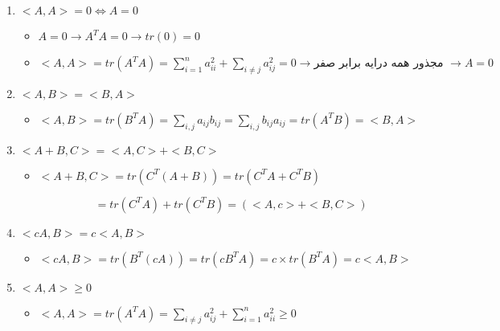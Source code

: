 \setLTR

\begin{enumerate}
	\item  $<A,A>=0 \Longleftrightarrow A=0$
	\begin{itemize}
		\item $A=0\rightarrow A^TA=0\rightarrow tr(0)=0$
		\item $<A,A>=tr(A^TA)=\sum^{n}_{i=1}a_{ii}^2 + \sum_{i\neq j}^{}a_{ij}^2=0 \rightarrow
		\text{مجذور همه درایه‌ برابر صفر } \rightarrow A=0$
	\end{itemize}
	\item $<A,B>=<B,A>$
	\begin{itemize}
		\item $<A,B>=tr(B^TA)=\sum_{i,j}^{}a_{ij}b_{ij}=\sum_{i,j}^{}b_{ij}a_{ij}=tr(A^TB)=<B,A>$
	\end{itemize}
	\item $<A+B,C>=<A,C>+<B,C>$
	\begin{itemize}
		\item $<A+B,C>=tr(C^T(A+B))=tr(C^TA+C^TB)$
		
		$\qquad \qquad \quad=tr(C^TA)+tr(C^TB)=(<A,c>+<B,C>)$
	\end{itemize}
	
	\item $<cA,B>=c<A,B>$
	\begin{itemize}
		\item $<cA,B>=tr(B^T(cA))=tr(cB^TA)=c\times tr(B^TA)=c<A,B>$
	\end{itemize}
	\item  $<A,A> \geq 0$
	\begin{itemize}
		\item $<A,A> = tr(A^TA)=\sum_{i\neq j}a^2_{ij} + \sum_{i=1}^{n}a^2_{ii} \ge 0$
	\end{itemize}
\end{enumerate}